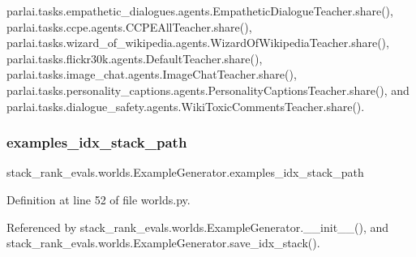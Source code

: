 parlai.\+tasks.\+empathetic\+\_\+dialogues.\+agents.\+Empathetic\+Dialogue\+Teacher.\+share(), parlai.\+tasks.\+ccpe.\+agents.\+C\+C\+P\+E\+All\+Teacher.\+share(), parlai.\+tasks.\+wizard\+\_\+of\+\_\+wikipedia.\+agents.\+Wizard\+Of\+Wikipedia\+Teacher.\+share(), parlai.\+tasks.\+flickr30k.\+agents.\+Default\+Teacher.\+share(), parlai.\+tasks.\+image\+\_\+chat.\+agents.\+Image\+Chat\+Teacher.\+share(), parlai.\+tasks.\+personality\+\_\+captions.\+agents.\+Personality\+Captions\+Teacher.\+share(), and parlai.\+tasks.\+dialogue\+\_\+safety.\+agents.\+Wiki\+Toxic\+Comments\+Teacher.\+share().

\mbox{\label{classstack__rank__evals_1_1worlds_1_1ExampleGenerator_a7db0970c7854ce8924ee67bc27434795}} 
\subsubsection{\texorpdfstring{examples\+\_\+idx\+\_\+stack\+\_\+path}{examples\_idx\_stack\_path}}
{\footnotesize\ttfamily stack\+\_\+rank\+\_\+evals.\+worlds.\+Example\+Generator.\+examples\+\_\+idx\+\_\+stack\+\_\+path}



Definition at line 52 of file worlds.\+py.



Referenced by stack\+\_\+rank\+\_\+evals.\+worlds.\+Example\+Generator.\+\_\+\+\_\+init\+\_\+\+\_\+(), and stack\+\_\+rank\+\_\+evals.\+worlds.\+Example\+Generator.\+save\+\_\+idx\+\_\+stack().

\mbox{\label{classstack__rank__evals_1_1worlds_1_1ExampleGenerator_a25ac01a7a0f457effd23aa7abdffd8c6}} 
